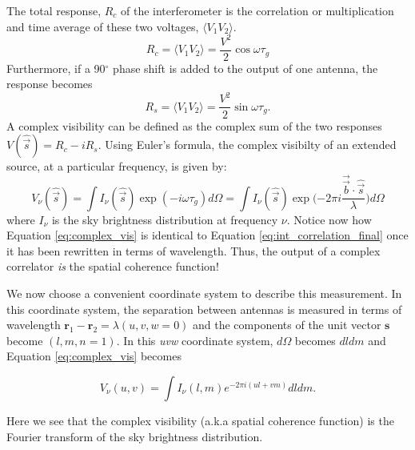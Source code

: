 The total response, $R_c$ of the interferometer is the correlation or multiplication and time average of these two voltages, $\langle V_1 V_2 \rangle$. 
$$
R_c = \langle V_1 V_2 \rangle = \frac{V^2}{2} \cos{\omega \tau_g}
$$
Furthermore, if a 90$^\circ$ phase shift is added to the output of one antenna, the response becomes
$$
R_s = \langle V_1 V_2 \rangle = \frac{V^2}{2} \sin{\omega \tau_g}.
$$
A complex visibility can be defined as the complex sum of the two responses $V(\hat{\Vec{s}}) = R_c - iR_s$. Using Euler's formula, the complex visibilty of an extended source, at a particular frequency, is given by:
\begin{equation}
\label{eq:complex_vis}
V_\nu(\hat{\Vec{s}}) = \int I_\nu(\hat{\Vec{s}}) \exp{(-i \omega \tau_g)} d\Omega = \int I_\nu(\hat{\Vec{s}}) \exp{(-2 \pi i \frac{\overrightarrow{\Vec{b}} \cdot \hat{\Vec{s}}}{\lambda}}) d\Omega
\end{equation}
where $I_\nu$ is the sky brightness distribution at frequency $\nu$. Notice now how Equation \ref{eq:complex_vis} is identical to Equation \ref{eq:int_correlation_final} once it has been rewritten in terms of wavelength. Thus, the output of a complex correlator \textit{is} the spatial coherence function!

We now choose a convenient coordinate system to describe this measurement. In this coordinate system, the separation between antennas is measured in terms of wavelength $\mathbf{r}_1 - \mathbf{r}_2 = \lambda(u, v, w=0)$ and the components of the unit vector $\mathbf{s}$ become $(l, m, n = 1)$. In this \textit{uvw} coordinate system, $d\Omega$ becomes $dl dm$ and Equation \ref{eq:complex_vis} becomes

\begin{equation}
\label{eq:complex_vis_uvw}
V_\nu(u,v) = \int I_\nu(l,m) e^{-2 \pi i (ul + vm)} dl dm.
\end{equation}

Here we see that the complex visibility (a.k.a spatial coherence function) is the Fourier transform of the sky brightness distribution.


